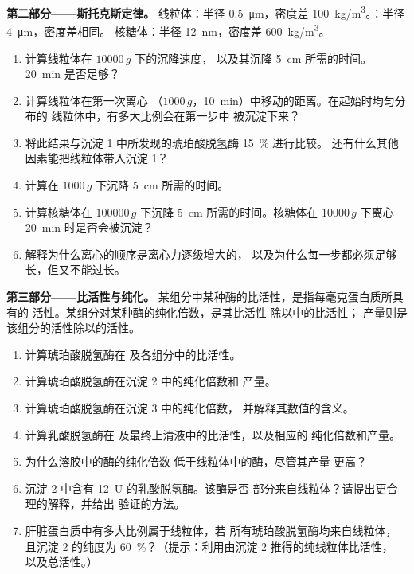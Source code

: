 \begin{problem}
\medskip
\noindent\textbf{第二部分——斯托克斯定律。}
线粒体：半径 \qty{0.5}{\micro m}，密度差
\qty{100}{kg/m^3}。：半径 \qty{4}{\micro m}，密度差相同。
核糖体：半径 \qty{12}{nm}，密度差 \qty{600}{kg/m^3}。
\begin{enumerate}[resume]
  \item 计算线粒体在 $\num{10000}\,g$ 下的沉降速度，
        以及其沉降 \qty{5}{cm} 所需的时间。
        \qty{20}{min} 是否足够？
  \item 计算线粒体在第一次离心
        （$1000\,g$，\qty{10}{min}）中移动的距离。在起始时均匀分布的
        线粒体中，有多大比例会在第一步中
        被沉淀下来？
  \item 将此结果与沉淀 1 中所发现的琥珀酸脱氢酶 \qty{15}{\%} 进行比较。
        还有什么其他因素能把线粒体带入沉淀 1？
  \item 计算在
        $1000\,g$ 下沉降 \qty{5}{cm} 所需的时间。
  \item 计算核糖体在
        $\num{100000}\,g$ 下沉降 \qty{5}{cm} 所需的时间。核糖体在
        $\num{10000}\,g$ 下离心 \qty{20}{min} 时是否会被沉淀？
  \item 解释为什么离心的顺序是离心力逐级增大的，
        以及为什么每一步都必须足够长，但又不能过长。
\end{enumerate}

\medskip
\noindent\textbf{第三部分——比活性与纯化。}
某组分中某种酶的比活性，是指每毫克蛋白质所具有的
活性。某组分对某种酶的纯化倍数，是其比活性
除以中的比活性；
产量则是该组分的活性除以的活性。
\begin{enumerate}[resume]
  \item 计算琥珀酸脱氢酶在
        及各组分中的比活性。
  \item 计算琥珀酸脱氢酶在沉淀 2 中的纯化倍数和
        产量。
  \item 计算琥珀酸脱氢酶在沉淀 3 中的纯化倍数，
        并解释其数值的含义。
  \item 计算乳酸脱氢酶在
        及最终上清液中的比活性，以及相应的
        纯化倍数和产量。
  \item 为什么溶胶中的酶的纯化倍数
        低于线粒体中的酶，尽管其产量
        更高？
  \item 沉淀 2 中含有 \qty{12}{U} 的乳酸脱氢酶。该酶是否
        部分来自线粒体？请提出更合理的解释，并给出
        验证的方法。
  \item 肝脏蛋白质中有多大比例属于线粒体，若
        所有琥珀酸脱氢酶均来自线粒体，且沉淀 2 的纯度为
        \qty{60}{\%}？（提示：利用由沉淀 2 推得的纯线粒体比活性，
        以及总活性。）
\end{enumerate}


\end{problem}
